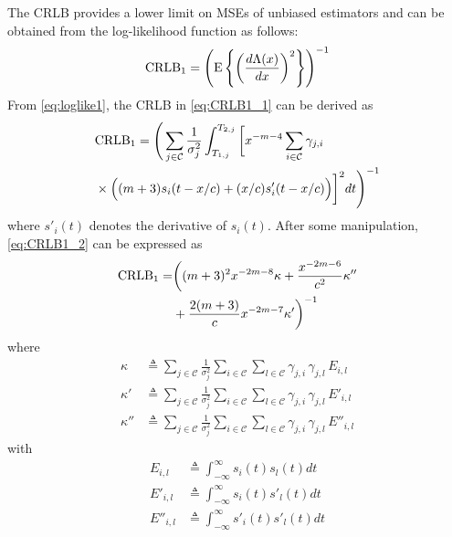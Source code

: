\documentclass[10pt,twocolumn]{IEEEtran}
\newcommand{\CRLB}{{\rm{CRLB}}}
\newcommand{\rmE}{{\rm{E}}}
\newcommand{\mtC}{{\mathcal{C}}}
\begin{document}
The CRLB provides a lower limit on MSEs of unbiased estimators and can be obtained from the log-likelihood function as follows:
\begin{gather}\label{eq:CRLB1_1}
\CRLB_1=\left(\rmE\left\{\left(\frac{d\Lambda(x)}{dx}\right)^2\right\}\right)^{-1}
\end{gather}
From \eqref{eq:loglike1}, the CRLB in \eqref{eq:CRLB1_1} can be derived as
\begin{align}\nonumber
&\CRLB_1=\Bigg(\sum_{j\in\mtC}\frac{1}{\sigma_j^2}\int_{T_{1,j}}^{T_{2,j}}
\bigg[x^{-m-4}\sum_{i\in\mtC}\gamma_{j,i}
\\\label{eq:CRLB1_2}
&\times\Big((m+3)s_i(t-x/c)+(x/c)s'_i(t-x/c)\Big)\bigg]^2dt
\Bigg)^{-1}
\end{align}
where $s'_i(t)$ denotes the derivative of $s_i(t)$. After some manipulation, \eqref{eq:CRLB1_2} can be expressed as
\begin{align}\nonumber
\CRLB_1=&\bigg((m+3)^2x^{-2m-8}\kappa+\frac{x^{-2m-6}}{c^2}\kappa''
\\\label{eq:CRLB1_3}
&+\frac{2(m+3)}{c}x^{-2m-7}\kappa'\bigg)^{-1}
\end{align}
where
\begin{align}\label{eq:kappa}
\kappa&\triangleq\sum_{j\in\mtC}\frac{1}{\sigma_j^2}\sum_{i\in\mtC}\sum_{l\in\mtC}\gamma_{j,i}\,\gamma_{j,l}\,E_{i,l}\\\label{eq:kappa1}
\kappa'&\triangleq\sum_{j\in\mtC}\frac{1}{\sigma_j^2}\sum_{i\in\mtC}\sum_{l\in\mtC}\gamma_{j,i}\,\gamma_{j,l}\,E'_{i,l}\\\label{eq:kappa2}
\kappa''&\triangleq\sum_{j\in\mtC}\frac{1}{\sigma_j^2}\sum_{i\in\mtC}\sum_{l\in\mtC}\gamma_{j,i}\,\gamma_{j,l}\,E''_{i,l}
\end{align}
with
\begin{align}\label{eq:Eil}
E_{i,l}&\triangleq\int_{-\infty}^{\infty}s_i(t)s_l(t)dt\\\label{eq:Eil1}
E'_{i,l}&\triangleq\int_{-\infty}^{\infty}s_i(t)s'_l(t)dt\\\label{eq:Eil2}
E''_{i,l}&\triangleq\int_{-\infty}^{\infty}s'_i(t)s'_l(t)dt
\end{align}
\end{document}
